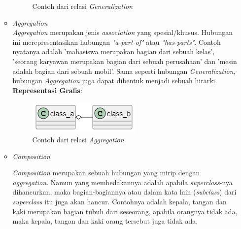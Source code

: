 \documentclass[a4paper]{article}
\begin{document}
\begin{enumerate}
\begin{itemize}
\begin{figure}[h]
            \caption{Contoh dari relasi \textit{Generalization}}
        \end{figure}
        \item \textit{Aggregation}\\
        \textit{Aggregation} merupakan jenis \textit{association} yang spesial/khusus. Hubungan ini merepresentasikan hubungan \textit{"a-part-of"} atau \textit{"has-parts"}. Contoh nyatanya adalah 'mahasiswa merupakan bagian dari sebuah kelas', 'seorang karyawan merupakan bagian dari sebuah perusahaan' dan 'mesin adalah bagian dari sebuah mobil'. Sama seperti hubungan \textit{Generalization}, hubungan \textit{Aggregation} juga dapat dibentuk menjadi sebuah hirarki\autocite{systemanalysisdesign-class-diagram-relations}.\\
        \textbf{Representasi Grafis}:\\
        \begin{figure}[h]
            \centering
            \includegraphics[scale=0.5]{class diagram - aggregation example.png}
            \caption{Contoh dari relasi \textit{Aggregation}}
        \end{figure}

        \newpage
        \item \textit{Composition}

        \textit{Composition} merupakan sebuah hubungan yang mirip dengan \textit{aggregation}. Namun yang membedakannya adalah apabila \textit{superclass}-nya dihancurkan, maka bagian-bagiannya atau dalam kata lain (\textit{subclass}) dari \textit{superclass} itu juga akan hancur. Contohnya adalah kepala, tangan dan kaki merupakan bagian tubuh dari seseorang, apabila orangnya tidak ada, maka kepala, tangan dan kaki orang tersebut juga tidak ada\autocite{what-is-class-diagram}.


\end{itemize}
\end{enumerate}
\end{document}
